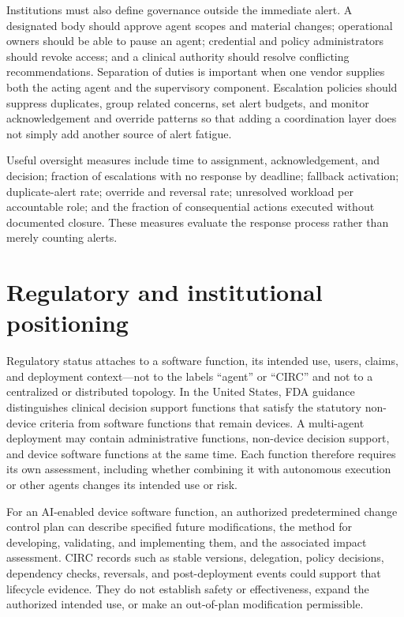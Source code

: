 \documentclass[10pt]{article}
\begin{document}
Institutions must also define governance outside the immediate alert. A designated body should
approve agent scopes and material changes; operational owners should be able to pause an agent;
credential and policy administrators should revoke access; and a clinical authority should resolve
conflicting recommendations. Separation of duties is important when one vendor supplies both the
acting agent and the supervisory component. Escalation policies should suppress duplicates, group
related concerns, set alert budgets, and monitor acknowledgement and override patterns so that adding
a coordination layer does not simply add another source of alert fatigue.

Useful oversight measures include time to assignment, acknowledgement, and decision; fraction of
escalations with no response by deadline; fallback activation; duplicate-alert rate; override and
reversal rate; unresolved workload per accountable role; and the fraction of consequential actions
executed without documented closure. These measures evaluate the response process rather than merely
counting alerts.

\section{Regulatory and institutional positioning}

Regulatory status attaches to a software function, its intended use, users, claims, and deployment
context---not to the labels ``agent'' or ``CIRC'' and not to a centralized or distributed topology.
In the United States, FDA guidance distinguishes clinical decision support functions that satisfy the
statutory non-device criteria from software functions that remain devices.\cite{fda2026cds} A
multi-agent deployment may contain administrative functions, non-device decision support, and device
software functions at the same time. Each function therefore requires its own assessment, including
whether combining it with autonomous execution or other agents changes its intended use or risk.

For an AI-enabled device software function, an authorized predetermined change control plan can
describe specified future modifications, the method for developing, validating, and implementing
them, and the associated impact assessment.\cite{fda2025pccp} CIRC records such as stable versions,
delegation, policy decisions, dependency checks, reversals, and post-deployment events could support
that lifecycle evidence. They do not establish safety or effectiveness, expand the authorized
intended use, or make an out-of-plan modification permissible.
\end{document}
